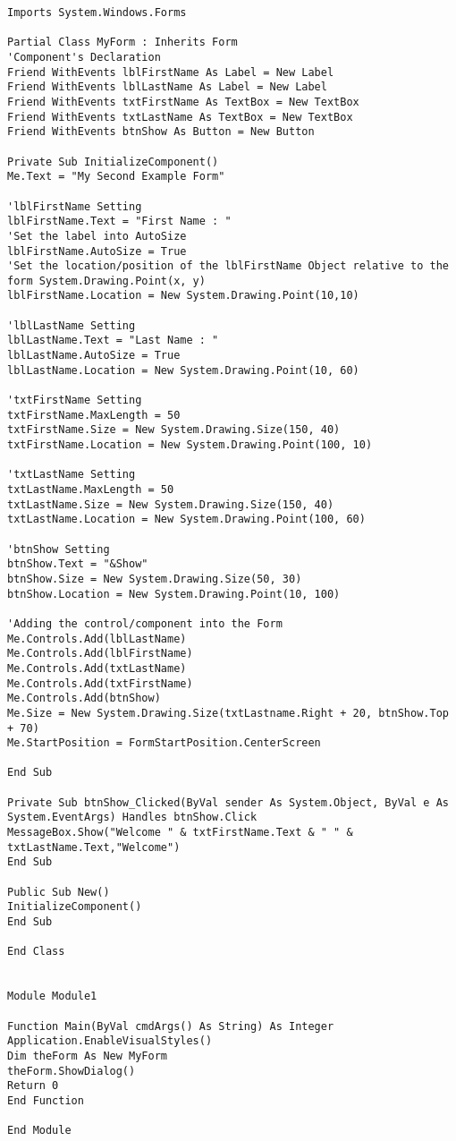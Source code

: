 \begin{lstlisting}
Imports System.Windows.Forms

Partial Class MyForm : Inherits Form
'Component's Declaration
Friend WithEvents lblFirstName As Label = New Label
Friend WithEvents lblLastName As Label = New Label
Friend WithEvents txtFirstName As TextBox = New TextBox
Friend WithEvents txtLastName As TextBox = New TextBox
Friend WithEvents btnShow As Button = New Button

Private Sub InitializeComponent()
Me.Text = "My Second Example Form"

'lblFirstName Setting
lblFirstName.Text = "First Name : " 
'Set the label into AutoSize
lblFirstName.AutoSize = True 
'Set the location/position of the lblFirstName Object relative to the form System.Drawing.Point(x, y)
lblFirstName.Location = New System.Drawing.Point(10,10) 

'lblLastName Setting
lblLastName.Text = "Last Name : " 
lblLastName.AutoSize = True
lblLastName.Location = New System.Drawing.Point(10, 60)

'txtFirstName Setting
txtFirstName.MaxLength = 50 
txtFirstName.Size = New System.Drawing.Size(150, 40)
txtFirstName.Location = New System.Drawing.Point(100, 10)

'txtLastName Setting
txtLastName.MaxLength = 50 
txtLastName.Size = New System.Drawing.Size(150, 40)
txtLastName.Location = New System.Drawing.Point(100, 60)

'btnShow Setting
btnShow.Text = "&Show" 
btnShow.Size = New System.Drawing.Size(50, 30)
btnShow.Location = New System.Drawing.Point(10, 100)

'Adding the control/component into the Form
Me.Controls.Add(lblLastName)
Me.Controls.Add(lblFirstName)
Me.Controls.Add(txtLastName)
Me.Controls.Add(txtFirstName)
Me.Controls.Add(btnShow)
Me.Size = New System.Drawing.Size(txtLastname.Right + 20, btnShow.Top + 70)
Me.StartPosition = FormStartPosition.CenterScreen

End Sub

Private Sub btnShow_Clicked(ByVal sender As System.Object, ByVal e As System.EventArgs) Handles btnShow.Click
MessageBox.Show("Welcome " & txtFirstName.Text & " " & txtLastName.Text,"Welcome")
End Sub

Public Sub New()
InitializeComponent()
End Sub

End Class


Module Module1

Function Main(ByVal cmdArgs() As String) As Integer
Application.EnableVisualStyles()
Dim theForm As New MyForm
theForm.ShowDialog()
Return 0
End Function

End Module
\end{lstlisting}




